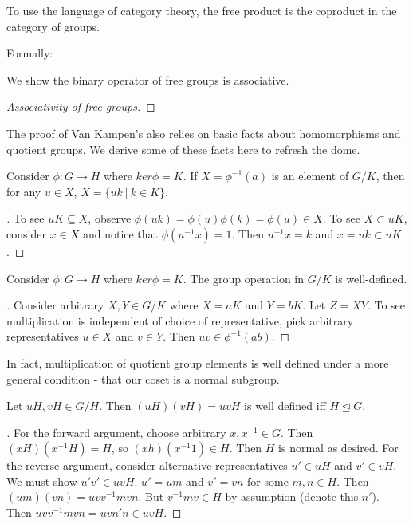 \documentclass[10pt]{article}
\begin{document}
To use the language of category theory, the free product is the coproduct in the category of groups.

Formally:

We show the binary operator of free groups is associative.

\begin{proof}[Associativity of free groups]

\end{proof}

The proof of Van Kampen's also relies on basic facts about homomorphisms and quotient groups. We derive some of these facts here to refresh the dome.

\begin{proposition}[]
	Consider $\phi: G \to H$ where $ker \phi = K$. If $X = \phi^{-1}(a)$ is an element of $G / K$, then for any $u \in X$, $X = \{ uk ~|~ k \in K \}$.
\end{proposition}

\begin{proof}[]
	To see $uK \subseteq X$, observe $\phi(uk) = \phi(u)\phi(k) = \phi(u) \in X$. To see $X \subset uK$, consider $x \in X$ and notice that $\phi(u^{-1}x) = 1$. Then $u^{-1}x = k$ and $x = uk \subset uK$.
\end{proof}

\begin{proposition}[]
	Consider $\phi: G \to H$ where $ker \phi = K$. The group operation in $G / K$ is well-defined.
\end{proposition}

\begin{proof}[]
	Consider arbitrary $X, Y \in G / K$ where $X = aK$ and $Y = bK$. Let $Z = XY$. To see multiplication is independent of choice of representative, pick arbitrary representatives $u \in X$ and $v \in Y$. Then $uv \in \phi^{-1}(ab)$.
\end{proof}

In fact, multiplication of quotient group elements is well defined under a more general condition - that our coset is a normal subgroup.

\begin{proposition}[]
	Let $uH, vH \in G / H$. Then $(uH)(vH) = uvH$ is well defined iff $H \trianglelefteq G$.
\end{proposition}

\begin{proof}[]
	For the forward argument, choose arbitrary $x, x^{-1} \in G$. Then $(xH)(x^{-1}H) = H$, so $(xh)(x^{-1}1) \in H$. Then $H$ is normal as desired.
	For the reverse argument, consider alternative representatives $u' \in uH$ and $v' \in vH$. We must show $u'v' \in uvH$. $u' = um$ and $v' = vn$ for some $m, n \in H$. Then $(um)(vn) = uvv^{-1}mvn$. But $v^{-1}mv \in H$ by assumption (denote this $n'$). Then $uvv^{-1}mvn = uvn'n \in uvH$.
\end{proof}
\end{document}
